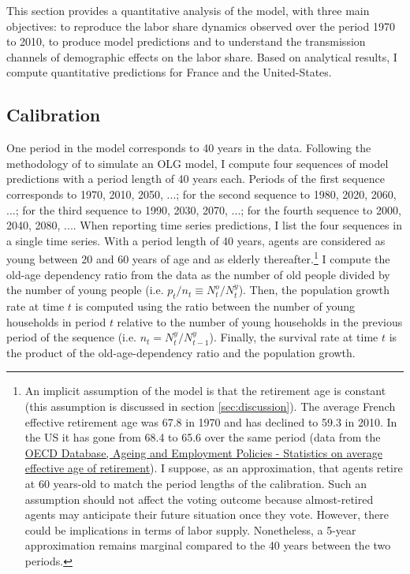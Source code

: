 This section provides a quantitative analysis of the model, with three main objectives: to reproduce the labor share dynamics observed over the period 1970 to 2010, to produce model predictions and to understand the transmission channels of demographic effects on the labor share. Based on analytical results, I compute quantitative predictions for France and the United-States.

\subsection{Calibration}\label{subsec:calibration}
One period in the model corresponds to 40 years in the data. Following the methodology of \cite{Gonzalez-Eiras2012} to simulate an OLG model, I compute four sequences of model predictions with a period length of 40 years each. Periods of the first sequence corresponds to 1970, 2010, 2050, ...; for the second sequence to 1980, 2020, 2060, ...; for the third sequence to 1990, 2030, 2070, ...; for the fourth sequence to 2000, 2040, 2080, .... When reporting time series predictions, I list the four sequences in a single time series.
With a period length of 40 years, agents are considered as young between 20 and 60 years of age and as elderly thereafter.\footnote{An implicit assumption of the model is that the retirement age is constant (this assumption is discussed in section \ref{sec:discussion}). The average French effective retirement age was 67.8 in 1970 and has declined to 59.3 in 2010. In the US it has gone from 68.4 to 65.6 over the same period (data from the \href{https://www.oecd.org/els/emp/average-effective-age-of-retirement.htm}{OECD Database, Ageing and Employment Policies - Statistics on average effective age of retirement}). I suppose, as an approximation, that agents retire at 60 years-old to match the period lengths of the calibration. Such an assumption should not affect the voting outcome because almost-retired agents may anticipate their future situation once they vote. However, there could be implications in terms of labor supply. Nonetheless, a 5-year approximation remains marginal compared to the 40 years between the two periods. %
} I compute the old-age dependency ratio from the data as the number of old people divided by the number of young people (i.e. $p_t/n_t \equiv N_t^o/N_t^y$). Then, the population growth rate at time $t$ is computed using the ratio between the number of young households in period $t$ relative to the number of young households in the previous period of the sequence (i.e. $n_t = N_t^y/N_{t-1}^y$). Finally, the survival rate at time $t$ is the product of the old-age-dependency ratio and the population growth.%
